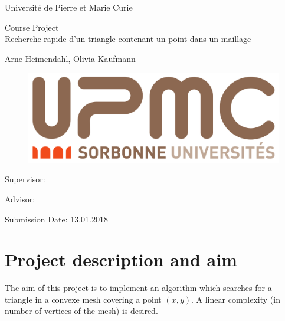 \documentclass[10pt]{article}
\begin{document}
	
\begin{titlepage}
	\begin{center}
	
		{\Large
			Université de Pierre et Marie Curie 
		}
		\normalsize
		
		Course Project\\[15mm]
		
		{\Huge
			Recherche rapide d’un triangle contenant un point dans un maillage
		}
		\vspace{2cm}
		
		\normalsize
		
		Arne Heimendahl, Olivia Kaufmann
		
		\begin{figure}[t]
			\includegraphics[scale=0.1]{UPMC_Sorbonne_Universites.png}
		\end{figure}
		
	\end{center}
	\vspace*{75mm}
	
	Supervisor: 
	\medskip
	
	Advisor: 
	\medskip
	
	Submission Date: 13.01.2018 
	
\end{titlepage}

\newpage
\tableofcontents
\newpage

	

\section{Project description and aim}


The aim of this project is to implement an algorithm which searches for a triangle in a convexe mesh covering a point $(x,y)$. A linear complexity (in number of vertices of the mesh) is desired.
\end{document}
